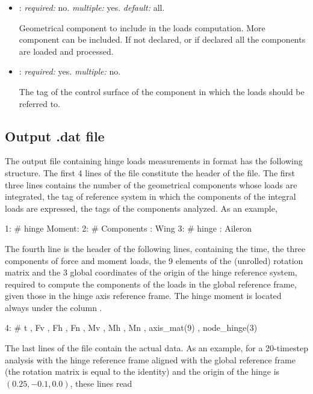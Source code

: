 \begin{itemize}
average the results in the given time span.

\item {}: \textit{required:} no. \textit{multiple:} yes. \textit{default:} all.

Geometrical component to include in the loads computation. More component can be included. 
If not declared, or if declared  all the components are loaded and processed. 

\item {}: \textit{required:} yes. \textit{multiple:} no.

The tag of the control surface of the component in which the loads should be referred to. 

\end{itemize}

\subsection{Output .dat file}
The output file containing hinge loads measurements in  
format has the following structure.
The first 4 lines of the file constitute the header of the file. 
The first three lines contains the number of the geometrical components 
 whose loads are integrated, the tag of reference system 
in which the components of the integral loads are expressed, the tags of 
the  components analyzed. As an example,
\begin{inputfile}
 1: # hinge Moment: 
 2: #               Components  : Wing
 3: #                    hinge  : Aileron
\end{inputfile}
The fourth line is the header of the following lines, containing the time, 
the three components of force and moment loads, the 9 elements of the (unrolled) 
rotation matrix and the 3 global coordinates of the origin of the hinge reference 
system, required to compute the components of the loads in the global reference 
frame, given those in the hinge axis reference frame. The hinge moment is located 
always under the column . 
\begin{inputfile}
 4: #  t , Fv , Fh , Fn , Mv , Mh , Mn , axis_mat(9) , node_hinge(3) 
\end{inputfile}
The last lines of the file contain the actual data. As an example, 
for a 20-timestep analysis with the hinge  reference frame  
aligned with the global reference frame (the rotation matrix is equal to the identity)
and the origin of the hinge is $(0.25,-0.1,0.0)$, these lines read
